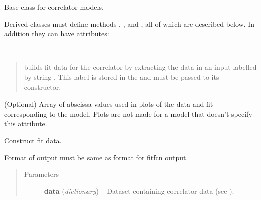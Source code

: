 \documentclass[letterpaper,10pt,english]{sphinxmanual}
\begin{document}

\begin{fulllineitems}
\label{corrfitter:corrfitter.BaseModel}
Base class for correlator models.

Derived classes must define methods , , and 
, all of which are described below. In addition they
can have attributes:

\begin{fulllineitems}
\label{corrfitter:BaseModel.datatag}~\begin{quote}

{\hyperref[corrfitter:corrfitter.CorrFitter]{}} builds fit data for the correlator by extracting the
data in an input  labelled by string . This
label is stored in the  and must be passed to its
constructor.
\end{quote}

\begin{fulllineitems}
\label{corrfitter:BaseModel._abscissa}
(Optional) Array of abscissa values used in plots of the data and
fit corresponding to the model. Plots are not made for a model that
doesn't specify this attribute.

\end{fulllineitems}


\end{fulllineitems}


\begin{fulllineitems}
\label{corrfitter:corrfitter.BaseModel.builddata}
Construct fit data.

Format of output must be same as format for fitfcn output.
\begin{quote}\begin{description}
\item[{Parameters}] \leavevmode
\textbf{data} (\emph{dictionary}) -- Dataset containing correlator data 
(see ).

\end{description}\end{quote}


\end{fulllineitems}
\end{fulllineitems}
\end{document}
